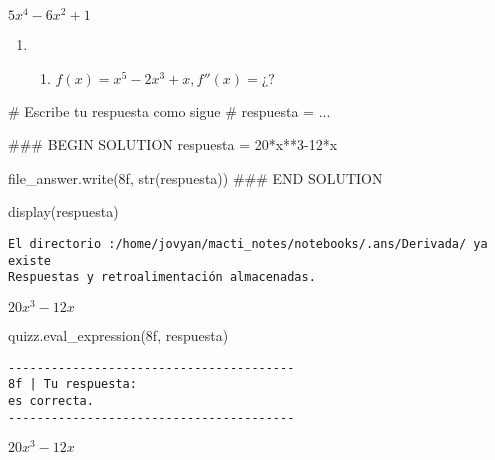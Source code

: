 \documentclass[
  letterpaper,
  DIV=11,
  numbers=noendperiod]{scrreprt}
\newenvironment{Shaded}{\begin{snugshade}}{\end{snugshade}}
\newcommand{\BuiltInTok}[1]{\textcolor[rgb]{0.00,0.23,0.31}{#1}}
\newcommand{\CommentTok}[1]{\textcolor[rgb]{0.37,0.37,0.37}{#1}}
\newcommand{\DecValTok}[1]{\textcolor[rgb]{0.68,0.00,0.00}{#1}}
\newcommand{\NormalTok}[1]{\textcolor[rgb]{0.00,0.23,0.31}{#1}}
\newcommand{\OperatorTok}[1]{\textcolor[rgb]{0.37,0.37,0.37}{#1}}
\newcommand{\RegionMarkerTok}[1]{\textcolor[rgb]{0.00,0.23,0.31}{#1}}
\newcommand{\StringTok}[1]{\textcolor[rgb]{0.13,0.47,0.30}{#1}}
\providecommand{\tightlist}{%
  \setlength{\itemsep}{0pt}\setlength{\parskip}{0pt}}\usepackage{longtable,booktabs,array}
\begin{document}
$\displaystyle 5 x^{4} - 6 x^{2} + 1$

\begin{enumerate}
\def\labelenumi{\arabic{enumi}.}
\setcounter{enumi}{7}
\tightlist
\item
  \begin{enumerate}
  \def\labelenumii{\alph{enumii}.}
  \setcounter{enumii}{5}
  \tightlist
  \item
    \(f(x) = x^5 - 2x^3 + x, f''(x) = ¿?\)
  \end{enumerate}
\end{enumerate}

\begin{Shaded}
\begin{Highlighting}[]
\CommentTok{\# Escribe tu respuesta como sigue }
\CommentTok{\# respuesta = ...}

\CommentTok{\#\#\# }\RegionMarkerTok{BEGIN}\CommentTok{ SOLUTION}
\NormalTok{respuesta }\OperatorTok{=} \DecValTok{20}\OperatorTok{*}\NormalTok{x}\OperatorTok{**}\DecValTok{3}\OperatorTok{{-}}\DecValTok{12}\OperatorTok{*}\NormalTok{x}

\NormalTok{file\_answer.write(}\StringTok{\textquotesingle{}8f\textquotesingle{}}\NormalTok{, }\BuiltInTok{str}\NormalTok{(respuesta))}
\CommentTok{\#\#\# }\RegionMarkerTok{END}\CommentTok{ SOLUTION}

\NormalTok{display(respuesta)}
\end{Highlighting}
\end{Shaded}

\begin{verbatim}
El directorio :/home/jovyan/macti_notes/notebooks/.ans/Derivada/ ya existe
Respuestas y retroalimentación almacenadas.
\end{verbatim}

$\displaystyle 20 x^{3} - 12 x$

\begin{Shaded}
\begin{Highlighting}[]
\NormalTok{quizz.eval\_expression(}\StringTok{\textquotesingle{}8f\textquotesingle{}}\NormalTok{, respuesta)}
\end{Highlighting}
\end{Shaded}

\begin{verbatim}
----------------------------------------
8f | Tu respuesta:
es correcta.
----------------------------------------
\end{verbatim}

$\displaystyle 20 x^{3} - 12 x$
\end{document}
